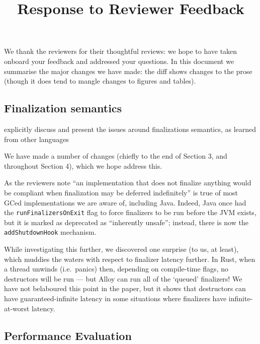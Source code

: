 \documentclass[12pt,a4paper,preprint]{article}
\begin{document}
\date{}  %
\title{Response to Reviewer Feedback}
\maketitle

We thank the reviewers for their thoughtful reviews: we hope to have
taken onboard your feedback and addressed your questions. In this document
we summarise the major changes we have made: the diff shows changes to the prose
(though it does tend to mangle changes to figures and tables).


\subsection*{Finalization semantics}

\begin{blockquote}
explicitly discuss and present the issues around finalizations semantics, as
  learned from other languages
\end{blockquote}

We have made a number of changes (chiefly to the end of Section 3, and
throughout Section 4), which we hope address this.

As the reviewers note ``an
implementation that does not finalize anything would be compliant when
finalization may be deferred indefinitely'' is true of most GCed
implementations we are aware of, including Java. Indeed, Java once had the
\lstinline{runFinalizersOnExit} flag to force finalizers to be run before the
JVM exists, but it is marked as deprecated as ``inherently unsafe''; instead,
there is now the \lstinline{addShutdownHook} mechanism.

While investigating this further, we discovered one surprise (to us, at least),
which muddies the waters with respect to finalizer latency further. In Rust,
when a thread unwinds (i.e.~panics) then, depending on compile-time flags, no
destructors will be run --- but Alloy can run all of the `queued' finalizers!
We have not belaboured this point in the paper, but it shows that destructors
can have guaranteed-infinite latency in some situations where finalizers have
infinite-at-worst latency.


\subsection*{Performance Evaluation}

\end{document}
